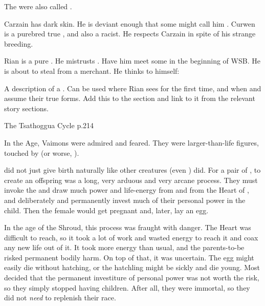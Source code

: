 The \nagae were also called \quo{\ichthyans}. 


Carzain has dark skin.
He is deviant enough that some might call him \demihuman.
Curwen is a purebred true \human, and also a racist. 
He respects Carzain in spite of his strange breeding. 


Rian is a pure \human. 
He mistrusts \demihumans. 
Have him meet some in the beginning of WSB.
He is about to steal from a \demihuman merchant. 
He thinks to himself:


A description of a \dragon. 
Can be used where Rian sees \Ishnaruchaefir for the first time, and when \Ishnaruchaefir and \Nzessuacrith assume their true forms. 
Add this to the \quo{\dragon} section and link to it from the relevant story sections.

The Tsathoggua Cycle p.214



In the \Scatha Age, Vaimons were admired and feared. 
They were larger-than-life figures, touched by \Iquin (or worse, \itzach). 



\Dragons did not just give birth naturally like other creatures (even \resphain) did. 
For a pair of \dragons, to create an offspring was a long, very arduous and very arcane process. 
They must invoke the \xss and draw much power and life-energy from \KhothSell and from the Heart of \Miith, and deliberately and permanently invest much of their personal power in the child. 
Then the female would get pregnant and, later, lay an egg. 

In the age of the Shroud, this process was fraught with danger. 
The Heart was difficult to reach, so it took a lot of work and wasted energy to reach it and coax any new life out of it. 
It took more energy than usual, and the \draconic parents-to-be risked permanent bodily harm.
On top of that, it was uncertain. 
The egg might easily die without hatching, or the hatchling might be sickly and die young.
Most \dragons decided that the permanent investiture of personal power was not worth the risk, so they simply stopped having children.
After all, they were immortal, so they did not \emph{need} to replenish their race. 


